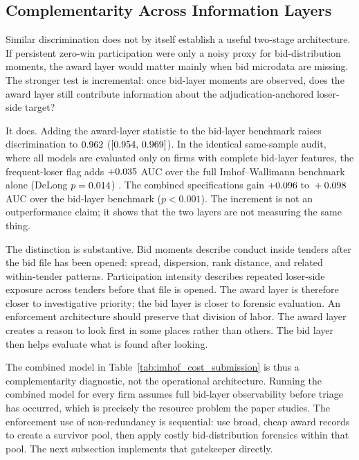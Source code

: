 \subsection{Complementarity Across Information Layers}
\label{sec:complementary_signals}

Similar discrimination does not by itself establish a useful
two-stage architecture. If persistent zero-win participation were
only a noisy proxy for bid-distribution moments, the award layer
would matter mainly when bid microdata are missing. The stronger
test is incremental: once bid-layer moments are observed, does
the award layer still contribute information about the
adjudication-anchored loser-side target?

It does. Adding the award-layer statistic to the bid-layer
benchmark raises discrimination to $0.962$
($[0.954,\,0.969]$). In the identical same-sample audit,
where all models are evaluated only on firms with complete
bid-layer features, the frequent-loser flag adds
$+0.035$ AUC over the full Imhof--Wallimann benchmark
alone (DeLong $p=0.014$) \citep{delong1988comparing}.
The combined specifications
gain $+0.096\text{ to }+0.098$ AUC over the bid-layer benchmark
($p<0.001$). The increment is not an outperformance claim; it
shows that the two layers are not measuring the same thing.

The distinction is substantive. Bid moments describe conduct
inside tenders after the bid file has been opened: spread,
dispersion, rank distance, and related within-tender patterns.
Participation intensity describes repeated loser-side exposure
across tenders before that file is opened. The award layer is
therefore closer to investigative priority; the bid layer is
closer to forensic evaluation. An enforcement architecture
should preserve that division of labor. The award layer creates a
reason to look first in some places rather than others. The bid
layer then helps evaluate what is found after looking.

The combined model in Table~\ref{tab:imhof_cost_submission} is thus a
complementarity diagnostic, not the operational architecture.
Running the combined model for every firm assumes full
bid-layer observability before triage has occurred, which is
precisely the resource problem the paper studies. The enforcement
use of non-redundancy is sequential: use broad, cheap award
records to create a survivor pool, then apply costly
bid-distribution forensics within that pool. The next subsection
implements that gatekeeper directly.

